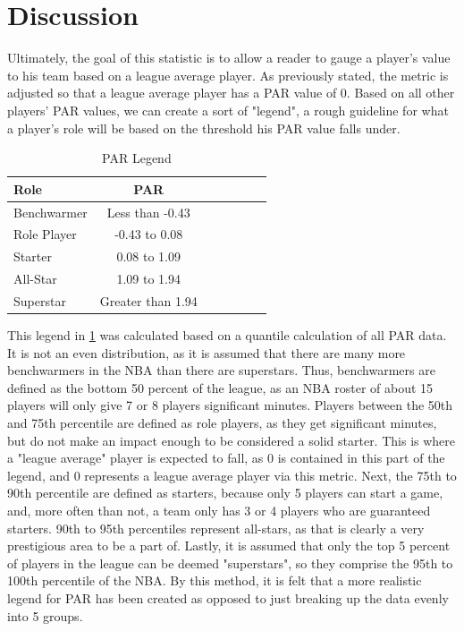 \documentclass[12pt]{article}
\begin{document}
\section{Discussion}
Ultimately, the goal of this statistic is to allow a reader to gauge a player's 
value to his team based on a 
league average player. As previously stated, the metric is adjusted so that 
a league average player has a 
PAR value of 0. Based on all other players' PAR values, we can create a 
sort of "legend", a rough guideline 
for what a player's role will be based on the threshold his PAR value falls 
under.

\begin{table}[tbp]
  \caption{PAR Legend}
  \label{tab:PARLegend}
\centering
\begin{tabular}[t]{lccllll}
  \toprule
  Role &  PAR\\
  \midrule
Benchwarmer & Less than -0.43\\
Role Player & -0.43 to 0.08\\
Starter & 0.08 to 1.09\\
All-Star & 1.09 to 1.94\\
Superstar & Greater than 1.94\\
  \bottomrule
\end{tabular}
\end{table}

This legend in \ref{tab:PARLegend} was calculated based on a quantile 
calculation of all PAR 
data. It is not an even distribution, as 
it is assumed that there are many more benchwarmers in the NBA than 
there are superstars. Thus, 
benchwarmers are defined as the bottom 50 percent of the league, as an 
NBA roster of about 15 players 
will only give 7 or 8 players significant minutes. Players between the 50th 
and 75th percentile are defined 
as role players, as they get significant minutes, but do not make an impact 
enough to be considered a solid 
starter. This is where  a "league average" player is expected to fall, as 0 is 
contained in this part of the 
legend, and 0 represents a league average player via this metric. Next, 
the 75th to 90th percentile are 
defined as starters, because only 5 players can start a game, and, more 
often than not, a team only has 3 
or 4 players who are guaranteed starters. 90th to 95th percentiles 
represent all-stars, as that is clearly a 
very prestigious area to be a part of. Lastly, it is assumed that only the top 
5 percent of players in the 
league can be deemed "superstars", so they comprise the 95th to 100th 
percentile of the NBA. By this 
method, it is felt that a more realistic legend for PAR has been created as 
opposed to just breaking up the 
data evenly into 5 groups.
\end{document}
